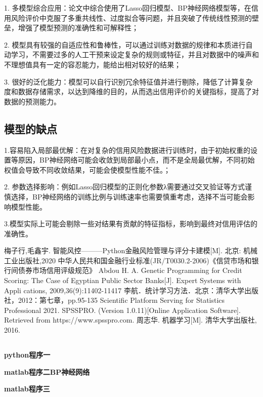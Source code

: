 \documentclass[12pt,a4paper]{nmmcm}
\begin{document}
1.  多模型综合应用：论文中综合使用了Lasso回归模型、BP神经网络模型等，在信用风险评价中克服了多重共线性、过度拟合等问题，并且突破了传统线性预测的壁垒，增强了模型预测的准确性和可解释性；


2.  模型具有较强的自适应性和鲁棒性，可以通过训练对数据的规律和本质进行自动学习，不需要过多的人工干预来设定复杂的规则或特征，并且对数据中的噪声和不理想值具有一定的容忍能力，能给出相对较好的结果；

3. 很好的泛化能力：模型可以自行识别冗余特征值并进行剔除，降低了计算复杂度和数据存储需求，以达到降维的目的，从而选出信用评价的关键指标，提高了对数据的预测能力。

\subsection{模型的缺点}
1.容易陷入局部最优解：在对复杂的信用风险数据进行训练时，由于初始权重的设置等原因，BP神经网络可能会收敛到局部最小点，而不是全局最优解，不同初始权值会导致不同收敛结果，可能会使模型性能不佳。；

2. 参数选择影响：例如Lasso回归模型的正则化参数λ需要通过交叉验证等方式谨慎选择，BP神经网络的训练比例与训练速率也需要慎重考虑，选择不当可能会影响模型性能。

3.模型实际上可能会剔除一些对结果有贡献的特征指标，影响到最终对信用评估的准确性。
\newpage

\begin{thebibliography}{99}
\bibitem[1] 梅子行,毛鑫宇. 智能风控———Python金融风险管理与评分卡建模[M]. 北京: 机械工业出版社,2020
\bibitem[2]中华人民共和国金融行业标准(JR/T0030.2-2006)《信贷市场和银行间债券市场信用评级规范》
\bibitem[3] Abdou H. A. Genetic Programming for Credit Scoring: The Case of Egyptian Public Sector Banks[J]. Expert Systems with Appli cations, 2009,36(9):11402-11417
\bibitem[4]李航．统计学习方法．北京：清华大学出版社，2012：第七章，pp.95-135
\bibitem[5] Scientific Platform Serving for Statistics Professional 2021. SPSSPRO. (Version 1.0.11)[Online Application Software]. Retrieved from https://www.spsspro.com.
\bibitem[6] 周志华. 机器学习[M]. 清华大学出版社, 2016.
\end{thebibliography}
\newpage

\begin{appendices}

\section*{}

\textbf{\textcolor[rgb]{0.65,0.35,0.10}{python程序一}}


\textcolor[rgb]{0.65,0.35,0.10}{\textbf{matlab程序二BP神经网络}}


\textcolor[rgb]{0.65,0.35,0.10}{\textbf{matlab程序三}}



\end{appendices}
\end{document}
